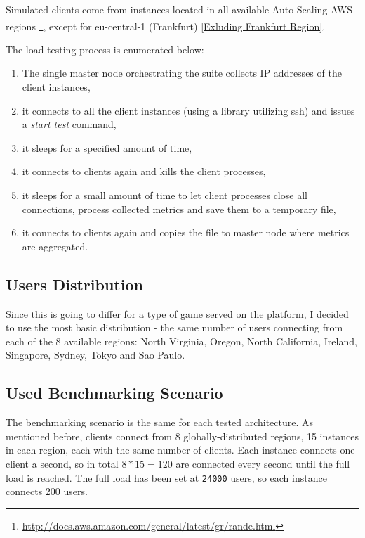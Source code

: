 \documentclass{uvamscse}
\begin{document}
Simulated clients come from instances located in all available Auto-Scaling AWS regions \footnote{\url{http://docs.aws.amazon.com/general/latest/gr/rande.html}}, except for eu-central-1 (Frankfurt) \ref{Exluding Frankfurt Region}.

The load testing process is enumerated below:
\begin{enumerate}
  \item The single master node orchestrating the suite collects IP addresses of the client instances,
  \item it connects to all the client instances (using a library utilizing ssh) and issues a \textit{start test} command,
  \item it sleeps for a specified amount of time,
  \item it connects to clients again and kills the client processes,
  \item it sleeps for a small amount of time to let client processes close all connections, process collected metrics and save them to a temporary file,
  \item it connects to clients again and copies the file to master node where metrics are aggregated.
\end{enumerate}

\subsection{Users Distribution}\label{Users Distribution}

Since this is going to differ for a type of game served on the platform, I decided to use the most basic distribution - the same number of users connecting from each of the 8 available regions: North Virginia, Oregon, North California, Ireland, Singapore, Sydney, Tokyo and Sao Paulo.

\subsection{Used Benchmarking Scenario}\label{Used Benchmarking Scenario}

The benchmarking scenario is the same for each tested architecture. As mentioned before, clients connect from 8 globally-distributed regions, 15 instances in each region, each with the same number of clients. Each instance connects one client a second, so in total $8*15=120$ are connected every second until the full load is reached. The full load has been set at \texttt{24000} users, so each instance connects 200 users.
\end{document}

